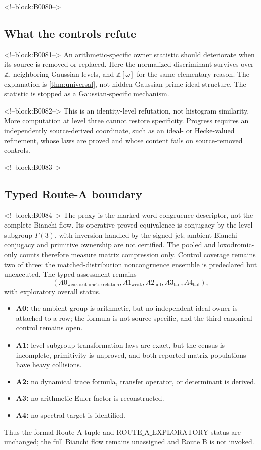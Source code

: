 \documentclass[11pt,a4paper]{article}
\theoremstyle{definition}
\theoremstyle{remark}
\newcommand{\Eis}{\mathbb{Z}[\omega]}
\begin{document}
<!--block:B0080-->
\subsection{What the controls refute}

<!--block:B0081-->
An arithmetic-specific owner statistic should deteriorate when its source is removed or replaced. Here the normalized discriminant survives over \(\mathbb Z\), neighboring Gaussian levels, and \(\Eis\) for the same elementary reason. The explanation is \cref{thm:universal}, not hidden Gaussian prime-ideal structure. The statistic is stopped as a Gaussian-specific mechanism.

<!--block:B0082-->
This is an identity-level refutation, not histogram similarity. More computation at level three cannot restore specificity. Progress requires an independently source-derived coordinate, such as an ideal- or Hecke-valued refinement, whose laws are proved and whose content fails on source-removed controls.

<!--block:B0083-->
\subsection{Typed Route-A boundary}

<!--block:B0084-->
The proxy is the marked-word congruence descriptor, not the complete Bianchi flow. Its operative proved equivalence is conjugacy by the level subgroup \(\Gamma(3)\), with inversion handled by the signed jet; ambient Bianchi conjugacy and primitive ownership are not certified. The pooled and loxodromic-only counts therefore measure matrix compression only. Control coverage remains two of three: the matched-distribution noncongruence ensemble is predeclared but unexecuted. The typed assessment remains
\[
 (A0_{\mathrm{weak\ arithmetic\ relation}},
 A1_{\mathrm{weak}},A2_{\mathrm{fail}},A3_{\mathrm{fail}},A4_{\mathrm{fail}}),
\]
with exploratory overall status.
\begin{itemize}
 \item \textbf{A0:} the ambient group is arithmetic, but no independent ideal owner is attached to a row; the formula is not source-specific, and the third canonical control remains open.
 \item \textbf{A1:} level-subgroup transformation laws are exact, but the census is incomplete, primitivity is unproved, and both reported matrix populations have heavy collisions.
 \item \textbf{A2:} no dynamical trace formula, transfer operator, or determinant is derived.
 \item \textbf{A3:} no arithmetic Euler factor is reconstructed.
 \item \textbf{A4:} no spectral target is identified.
\end{itemize}
Thus the formal Route-A tuple and \(\mathrm{ROUTE\_A\_EXPLORATORY}\) status are unchanged; the full Bianchi flow remains unassigned and Route B is not invoked.
\end{document}
